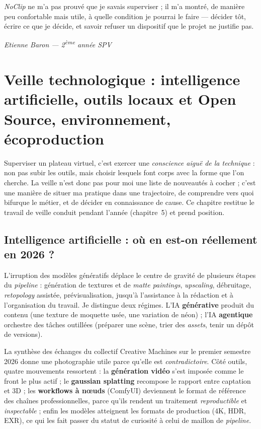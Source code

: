 \documentclass[11pt,a4paper]{report}
\begin{document}
\begin{infobox}[title={En une phrase}]
\textit{NoClip} ne m'a pas prouvé que je savais superviser ; il m'a montré, de manière peu
confortable mais utile, à quelle condition je pourrai le faire --- décider tôt, écrire ce que je
décide, et savoir refuser un dispositif que le projet ne justifie pas.
\end{infobox}

\vspace{1cm}
\begin{flushright}
\textit{Etienne Baron --- 2\textsuperscript{ème} année SPV}
\end{flushright}

\chapter{Veille technologique : intelligence artificielle, outils locaux et Open Source, environnement, écoproduction}
Superviser un plateau virtuel, c'est exercer une \emph{conscience aiguë de la technique} : non pas
subir les outils, mais choisir lesquels font corps avec la forme que l'on cherche. La veille n'est
donc pas pour moi une liste de nouveautés à cocher ; c'est une manière de situer ma pratique
dans une trajectoire, de comprendre vers quoi bifurque le métier, et de décider en connaissance
de cause. Ce chapitre restitue le travail de veille conduit pendant l'année (chapitre~5) et prend
position.

\section{Intelligence artificielle : où en est-on réellement en 2026 ?}
L'irruption des modèles génératifs déplace le centre de gravité de plusieurs étapes du
\emph{pipeline} : génération de textures et de \emph{matte paintings}, \emph{upscaling},
débruitage, \emph{retopology} assistée, prévisualisation, jusqu'à l'assistance à la rédaction et à
l'organisation du travail. Je distingue deux régimes. L'IA \textbf{générative} produit du contenu
(une texture de moquette usée, une variation de néon) ; l'IA \textbf{agentique} orchestre des
tâches outillées (préparer une scène, trier des \emph{assets}, tenir un dépôt de versions).

La synthèse des échanges du collectif Creative Machines sur le premier semestre 2026
\autocite{creativemachines2026} donne une photographie utile parce qu'elle est \emph{contra\-dictoire}.
Côté outils, quatre mouvements ressortent : la \textbf{génération vidéo} s'est imposée comme le
front le plus actif ; le \textbf{gaussian splatting} recompose le rapport entre captation et 3D ;
les \textbf{workflows à n\oe uds} (ComfyUI) deviennent le format de référence des chaînes
professionnelles, parce qu'ils rendent un traitement \emph{reproductible} et \emph{inspectable} ;
enfin les modèles atteignent les formats de production (4K, HDR, EXR), ce qui les fait passer du
statut de curiosité à celui de maillon de \emph{pipeline}.
\end{document}
